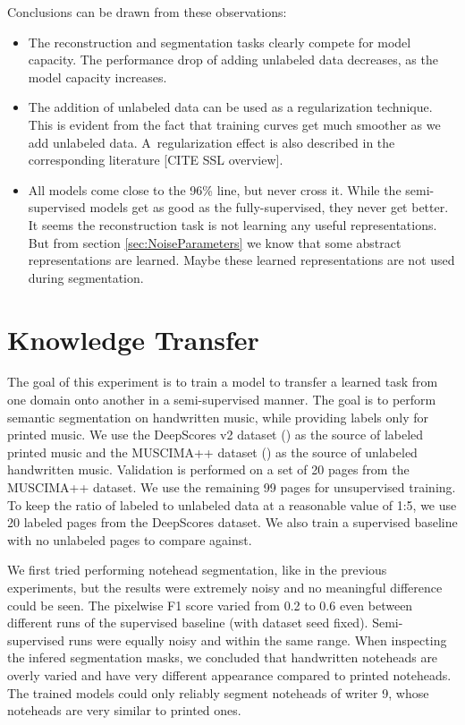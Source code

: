 Conclusions can be drawn from these observations:

\begin{itemize}
    \item The reconstruction and segmentation tasks clearly compete for model capacity. The performance drop of adding unlabeled data decreases, as the model capacity increases.
    \item The addition of unlabeled data can be used as a regularization technique. This is evident from the fact that training curves get much smoother as we add unlabeled data. A~regularization effect is also described in the corresponding literature [CITE SSL overview].
    \item All models come close to the 96\% line, but never cross it. While the semi-supervised models get as good as the fully-supervised, they never get better. It seems the reconstruction task is not learning any useful representations. But from section \ref{sec:NoiseParameters} we know that some abstract representations are learned. Maybe these learned representations are not used during segmentation.
\end{itemize}


\section{Knowledge Transfer}
\label{sec:KnowledgeTransfer}

The goal of this experiment is to train a model to transfer a learned task from one domain onto another in a semi-supervised manner. The goal is to perform semantic segmentation on handwritten music, while providing labels only for printed music. We use the DeepScores v2 dataset (\cite{DeepScores}) as the source of labeled printed music and the MUSCIMA++ dataset (\cite{MuscimaPP}) as the source of unlabeled handwritten music. Validation is performed on a set of 20 pages from the MUSCIMA++ dataset. We use the remaining 99 pages for unsupervised training. To keep the ratio of labeled to unlabeled data at a reasonable value of 1:5, we use 20 labeled pages from the DeepScores dataset. We also train a supervised baseline with no unlabeled pages to compare against.

We first tried performing notehead segmentation, like in the previous experiments, but the results were extremely noisy and no meaningful difference could be seen. The pixelwise F1 score varied from 0.2 to 0.6 even between different runs of the supervised baseline (with dataset seed fixed). Semi-supervised runs were equally noisy and within the same range. When inspecting the infered segmentation masks, we concluded that handwritten noteheads are overly varied and have very different appearance compared to printed noteheads. The trained models could only reliably segment noteheads of writer 9, whose noteheads are very similar to printed ones.


